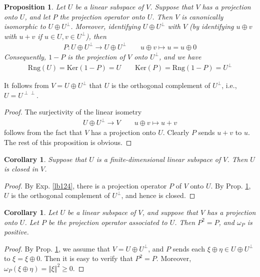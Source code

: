 \documentclass[12pt,b5paper,notitlepage]{article}
\theoremstyle{definition}
\theoremstyle{plain}
\newtheorem{pp}[df]{Proposition}
\newtheorem{co}[df]{Corollary}
\newcommand{\Ker}{\mathrm{Ker}}
\newcommand{\Rng}{\mathrm{Rng}}
\numberwithin{equation}{section}
\begin{document}
\begin{pp}\label{lb146}
Let $U$ be a linear subspace of $V$. Suppose that $V$ has a projection onto $U$, and let $P$ the projection operator onto $U$. Then $V$ is canonically isomorphic to $U\oplus U^\perp$. Moreover, identifying $U\oplus U^\perp$ with $V$ (by identifying $u\oplus v$ with $u+v$ if $u\in U,v\in U^\perp$), then
\begin{align*}
P:U\oplus U^\perp\rightarrow U\oplus U^\perp\qquad u\oplus v\mapsto u=u\oplus 0
\end{align*}
Consequently, $1-P$ is the projection of $V$ onto $U^\perp$, and we have 
\begin{align*}
\Rng(U)=\Ker(1-P)=U\qquad \Ker(P)=\Rng(1-P)=U^\perp
\end{align*}
\end{pp}

It follows from $V=U\oplus U^\perp$ that $U$ is the orthogonal complement of $U^\perp$, i.e., $U=U^{\perp\perp}$.

\begin{proof}
The surjectivity of the linear isometry
\begin{gather*}
U\oplus U^\perp\rightarrow V\qquad u\oplus v\mapsto u+v
\end{gather*}
follows from the fact that $V$ has a projection onto $U$. Clearly $P$ sends $u+v$ to $u$. The rest of this proposition is obvious.
\end{proof}




\begin{co}
Suppose that $U$ is a finite-dimensional linear subspace of $V$. Then $U$ is closed in $V$.
\end{co}


\begin{proof}
By Exp. \ref{lb124}, there is a projection operator $P$ of $V$ onto $U$. By Prop. \ref{lb146}, $U$ is the orthogonal complement of $U^\perp$, and hence is closed.
\end{proof}


\begin{co}\label{lb171}
Let $U$ be a linear subspace of $V$, and suppose that $V$ has a projection onto $U$. Let $P$ be the projection operator associated to $U$. Then $P^2=P$, and $\omega_P$ is positive.
\end{co}


\begin{proof}
By Prop. \ref{lb146}, we assume that $V=U\oplus U^\perp$, and $P$ sends each $\xi\oplus\eta\in U\oplus U^\perp$ to $\xi=\xi\oplus 0$. Then it is easy to verify that $P^2=P$. Moreover, $\omega_P(\xi\oplus\eta)=\Vert\xi\Vert^2\geq0$.
\end{proof}
\end{document}
